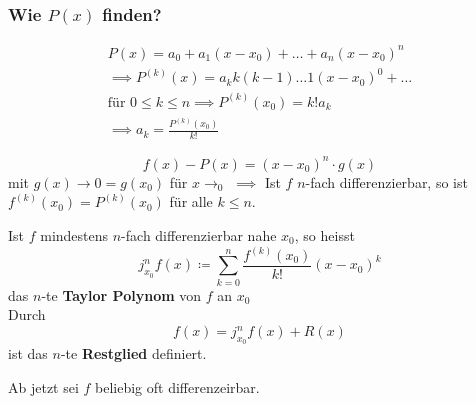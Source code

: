 \subsubsection{Wie \texorpdfstring{$P(x)$}{P(x)} finden?}
\begin{gather*}
	P(x) = a_0 + a_1 (x-x_0) + \dots + a_n (x-x_0)^n \\
	\implies P^{(k)}(x) = a_k k (k-1) \dots 1 (x-x_0)^0 + \dots \\
	\text{für } 0 \leq k \leq n \implies P^{(k)}(x_0) = k! a_k \\
	\implies a_k = \frac{P^{(k)}(x_0)}{k!}
\end{gather*}
\begin{bem}
	\[ f(x) - P(x) = (x-x_0)^n \cdot g(x) \]
	mit $g(x) \rightarrow 0 = g(x_0)$ für $x \rightarrow _0$
	$\implies$ Ist $f$ $n$-fach differenzierbar, so ist $f^{(k)}(x_0) = P^{(k)}(x_0)$ für alle $k \leq n$.
\end{bem}
\begin{def*}[note = Taylor Polynom , index = Taylor Polynom]
	Ist $f$ mindestens $n$-fach differenzierbar nahe $x_0$, so heisst
	\[ j_{x_0}^n f(x) \coloneqq \sum_{k=0}^n \frac{f^{(k)}(x_0)}{k!} (x-x_0)^k \]
	das $n$-te \textbf{Taylor Polynom} von $f$ an $x_0$ \\
	Durch
	\[ f(x) = j_{x_0}^n f(x) + R(x) \]
	ist das $n$-te \textbf{Restglied} definiert.
\end{def*}
Ab jetzt sei $f$ beliebig oft differenzeirbar. \\
